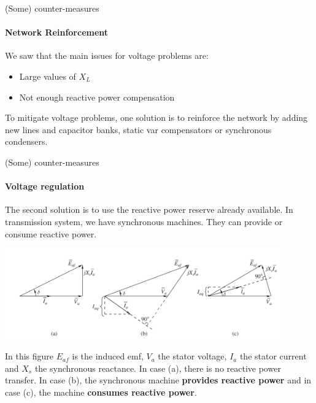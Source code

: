 









\begin{frame}
{(Some) counter-measures}
\framesubtitle{Network Reinforcement}
We saw that the main issues for voltage problems are:
\begin{itemize}
    \item Large values of $X_L$
    \item Not enough reactive power compensation
\end{itemize}
To mitigate voltage problems, one solution is to reinforce the network by adding new lines and capacitor banks, static var compensators or synchronous condensers.
\end{frame}

\begin{frame}
{(Some) counter-measures}
\framesubtitle{Voltage regulation}
The second solution is to use the reactive power reserve already available.
In transmission system, we have synchronous machines. They can provide or consume reactive power.
\begin{center}
\includegraphics[width=0.9\textwidth]{images/SG_EMF.png}
\end{center}
In this figure $E_{af}$ is the induced emf, $V_a$ the stator voltage, $I_a$ the stator current and $X_s$ the synchronous reactance. In case (a), there is no reactive power transfer. In case (b), the synchronous machine \textbf{provides reactive power} and in case (c), the machine \textbf{consumes reactive power}.
\end{frame}

